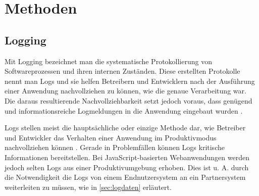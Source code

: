 

\vspace{-\baselineskip}

\section{Methoden}

\subsection{Logging}


Mit Logging bezeichnet man die systematische Protokollierung von Softwareprozessen und ihren internen Zuständen. Diese erstellten Protokolle nennt man Logs und sie helfen Betreibern und Entwicklern nach der Ausführung einer Anwendung nachvollziehen zu können, wie die genaue Verarbeitung war. Die daraus resultierende Nachvollziehbarkeit setzt jedoch voraus, dass genügend und informationsreiche Logmeldungen in die Anwendung eingebaut wurden \cite{LearningToLog}.

Logs stellen meist die hauptsächliche oder einzige Methode dar, wie Betreiber und Entwickler das Verhalten einer Anwendung im Produktivmodus nachvollziehen können \cite{LearningToLog}. Gerade in Problemfällen können Logs kritische Informationen bereitstellen. Bei JavaScript-basierten Webanwendungen werden jedoch selten Logs aus einer Produktivumgebung erhoben. Dies ist u. A. durch die Notwendigkeit die Logs von einem Endnutzersystem an ein Partnersystem weiterleiten zu müssen, wie in \autoref{sec:logdaten} erläutert.

